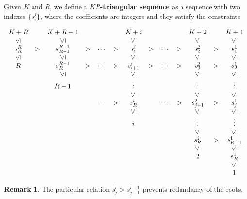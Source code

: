 \documentclass[a4paper]{article}\usepackage[english]{babel}
\theoremstyle{definition}
\newtheorem{remark}[theorem]{Remark}
\renewcommand{\emph}[1]{\textbf{#1}}
\begin{document}
Given $K$ and $R$,  we define a \emph{$KR$-triangular sequence} as a sequence with two indexes $\{s_{i}^j\}$, where the coefficients are integers and they satisfy the constraints


\begin{equation}\label{eq:triangular-sec}
\scriptsize
\begin{array}{ccccccccccccc}
K+R&&K+R-1&&&&K+i&&&&K+2&&K+1\\
\rotatebox[origin=c]{90}{$\leq$}&&\rotatebox[origin=c]{90}{$\leq$}&&&&\rotatebox[origin=c]{90}{$\leq$}&&&&\rotatebox[origin=c]{90}{$\leq$}&&\rotatebox[origin=c]{90}{$\leq$}\\
s_{R}^{R}&>&s_{R-1}^{R-1}&>&\cdots&>&s_{i}^{i}&>&\cdots&>&s_{2}^{2}&>&s_{1}^1 \\
\rotatebox[origin=c]{90}{$\leq$}&&\rotatebox[origin=c]{90}{$\leq$}&&&&\rotatebox[origin=c]{90}{$\leq$}&&&&\rotatebox[origin=c]{90}{$\leq$}&&\rotatebox[origin=c]{90}{$\leq$}\\
R&&s_{R}^{R-1}&>&\cdots&>&s_{i+1}^{i}&>&\cdots&>&s_{3}^{2}&>&s_{2}^1\\
&&\rotatebox[origin=c]{90}{$\leq$}&&&&\rotatebox[origin=c]{90}{$\leq$}&&&&\rotatebox[origin=c]{90}{$\leq$}
&&\rotatebox[origin=c]{90}{$\leq$}\\
&&R-1&&&&\vdots&&&&\vdots&&\vdots\\
&&&&&&\rotatebox[origin=c]{90}{$\leq$}&&&&\rotatebox[origin=c]{90}{$\leq$}&&\rotatebox[origin=c]{90}{$\leq$}\\
&&&&\cdots&>&s_{R}^{i}&&\cdots&>&s_{j+1}^{2}&>&s_{j}^1\\
&&&&&&\rotatebox[origin=c]{90}{$\leq$}&&&&\rotatebox[origin=c]{90}{$\leq$}&&\rotatebox[origin=c]{90}{$\leq$}\\
&&&&&&i&&&&\vdots&&\vdots\\
&&&&&&&&&&\rotatebox[origin=c]{90}{$\leq$}&&\rotatebox[origin=c]{90}{$\leq$}\\

&&&&&&&&&&s_{R}^{2}&>&s_{R-1}^1\\
&&&&&&&&&&\rotatebox[origin=c]{90}{$\leq$}&&\rotatebox[origin=c]{90}{$\leq$}\\
&&&&&&&&&&2&&s_{R}^1\\
&&&&&&&&&&&&\rotatebox[origin=c]{90}{$\leq$}\\
&&&&&&&&&&&&1
\end{array}
\end{equation}


\begin{remark}\label{column}
The particular relation $s_{j}^i>s_{j-1}^{i-1}$  prevents redundancy of the roots.
\end{remark}
\end{document}
